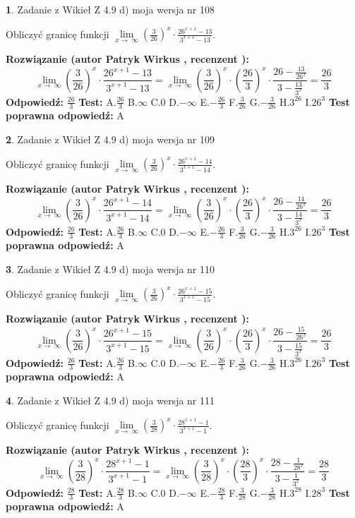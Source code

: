 \documentclass[12pt, a4paper]{article}
\theoremstyle{definition} %
\newtheorem{zad}{}
\newcommand{\zadStart}[1]{\begin{zad}#1\newline}
\newcommand{\zadStop}{\end{zad}}
\newcommand{\rozwStart}[2]{\noindent \textbf{Rozwiązanie (autor #1 , recenzent #2): }\newline}
\newcommand{\rozwStop}{\newline}
\newcommand{\odpStart}{\noindent \textbf{Odpowiedź:}\newline}
\newcommand{\odpStop}{\newline}
\newcommand{\testStart}{\noindent \textbf{Test:}\newline}
\newcommand{\testStop}{\newline}
\newcommand{\kluczStart}{\noindent \textbf{Test poprawna odpowiedź:}\newline}
\newcommand{\kluczStop}{\newline}
\begin{document}
\zadStart{Zadanie z Wikieł Z 4.9 d) moja wersja nr 108}


Obliczyć granicę funkcji  $\lim\limits_{x\to\ \infty}(\frac{3}{26})^{x}\cdot\frac{26^{x+1}-13}{3^{x+1}-13}$.
\zadStop
\rozwStart{Patryk Wirkus}{}
$$\lim\limits_{x\to\ \infty}(\frac{3}{26})^{x}\cdot\frac{26^{x+1}-13}{3^{x+1}-13}=\lim\limits_{x\to\ \infty}(\frac{3}{26})^{x}\cdot(\frac{26}{3})^{x} \cdot \frac{26-\frac{13}{26^{x}}}{3-\frac{13}{3^{x}}} = \frac{26}{3}$$
\rozwStop
\odpStart
$\frac{26}{3}$
\odpStop
\testStart
A.$\frac{26}{3}$ B.$\infty$ C.$0$ D.$-\infty$ E.$-\frac{26}{3}$
F.$\frac{3}{26}$ G.$-\frac{3}{26}$
H.$3^{26}$
I.$26^{3}$
\testStop
\kluczStart
A
\kluczStop



\zadStart{Zadanie z Wikieł Z 4.9 d) moja wersja nr 109}


Obliczyć granicę funkcji  $\lim\limits_{x\to\ \infty}(\frac{3}{26})^{x}\cdot\frac{26^{x+1}-14}{3^{x+1}-14}$.
\zadStop
\rozwStart{Patryk Wirkus}{}
$$\lim\limits_{x\to\ \infty}(\frac{3}{26})^{x}\cdot\frac{26^{x+1}-14}{3^{x+1}-14}=\lim\limits_{x\to\ \infty}(\frac{3}{26})^{x}\cdot(\frac{26}{3})^{x} \cdot \frac{26-\frac{14}{26^{x}}}{3-\frac{14}{3^{x}}} = \frac{26}{3}$$
\rozwStop
\odpStart
$\frac{26}{3}$
\odpStop
\testStart
A.$\frac{26}{3}$ B.$\infty$ C.$0$ D.$-\infty$ E.$-\frac{26}{3}$
F.$\frac{3}{26}$ G.$-\frac{3}{26}$
H.$3^{26}$
I.$26^{3}$
\testStop
\kluczStart
A
\kluczStop



\zadStart{Zadanie z Wikieł Z 4.9 d) moja wersja nr 110}


Obliczyć granicę funkcji  $\lim\limits_{x\to\ \infty}(\frac{3}{26})^{x}\cdot\frac{26^{x+1}-15}{3^{x+1}-15}$.
\zadStop
\rozwStart{Patryk Wirkus}{}
$$\lim\limits_{x\to\ \infty}(\frac{3}{26})^{x}\cdot\frac{26^{x+1}-15}{3^{x+1}-15}=\lim\limits_{x\to\ \infty}(\frac{3}{26})^{x}\cdot(\frac{26}{3})^{x} \cdot \frac{26-\frac{15}{26^{x}}}{3-\frac{15}{3^{x}}} = \frac{26}{3}$$
\rozwStop
\odpStart
$\frac{26}{3}$
\odpStop
\testStart
A.$\frac{26}{3}$ B.$\infty$ C.$0$ D.$-\infty$ E.$-\frac{26}{3}$
F.$\frac{3}{26}$ G.$-\frac{3}{26}$
H.$3^{26}$
I.$26^{3}$
\testStop
\kluczStart
A
\kluczStop



\zadStart{Zadanie z Wikieł Z 4.9 d) moja wersja nr 111}


Obliczyć granicę funkcji  $\lim\limits_{x\to\ \infty}(\frac{3}{28})^{x}\cdot\frac{28^{x+1}-1}{3^{x+1}-1}$.
\zadStop
\rozwStart{Patryk Wirkus}{}
$$\lim\limits_{x\to\ \infty}(\frac{3}{28})^{x}\cdot\frac{28^{x+1}-1}{3^{x+1}-1}=\lim\limits_{x\to\ \infty}(\frac{3}{28})^{x}\cdot(\frac{28}{3})^{x} \cdot \frac{28-\frac{1}{28^{x}}}{3-\frac{1}{3^{x}}} = \frac{28}{3}$$
\rozwStop
\odpStart
$\frac{28}{3}$
\odpStop
\testStart
A.$\frac{28}{3}$ B.$\infty$ C.$0$ D.$-\infty$ E.$-\frac{28}{3}$
F.$\frac{3}{28}$ G.$-\frac{3}{28}$
H.$3^{28}$
I.$28^{3}$
\testStop
\kluczStart
A
\kluczStop
\end{document}
